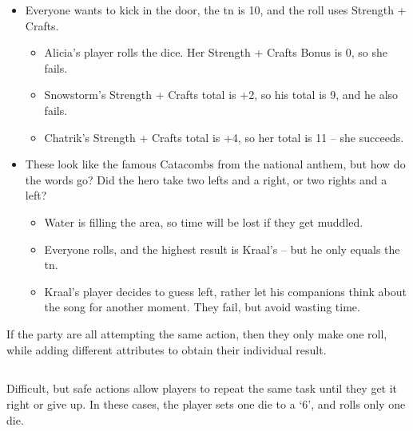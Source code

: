 \begin{multicols}{2}
\begin{exampletext}
\begin{itemize}
  \item
  Everyone wants to kick in the door, the \gls{tn} is 10, and the roll uses Strength + Crafts.
    \begin{itemize}
    \item
    Alicia's player rolls the dice. Her Strength + Crafts Bonus is 0, so she fails.
    \item
    Snowstorm's Strength + Crafts total is +2, so his total is 9, and he also fails.
    \item
    Chatrik's Strength + Crafts total is +4, so her total is 11 -- she succeeds.
    \end{itemize}
  \item
  These look like the famous Catacombs from the national anthem, but how do the words go?
  Did the hero take two lefts and a right, or two rights and a left?
    \begin{itemize}
    \item
    Water is filling the area, so time will be lost if they get muddled.
    \item
    Everyone rolls, and the highest result is Kraal's -- but he only equals the \gls{tn}.
    \item
    Kraal's player decides to guess left, rather let his companions think about the song for another moment.
    They fail, but avoid wasting time.
    \end{itemize}
\end{itemize}

\end{exampletext}

If the party are all attempting the same action, then they only make one roll, while adding different attributes to obtain their individual result.

\subsection{}\label{restingactions}

Difficult, but safe actions allow players to repeat the same task until they get it right or give up.
In these cases, the player sets one die to a `6', and rolls only one die.


\end{multicols}
